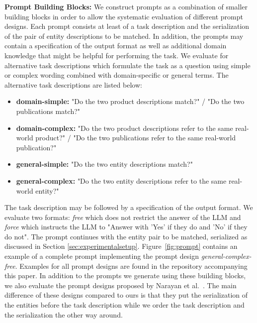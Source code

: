 \documentclass[sigconf,nonacm]{acmart}
\begin{document}
\textbf{Prompt Building Blocks:} We construct prompts as a combination of smaller building blocks in order to allow the systematic evaluation of different prompt designs. Each prompt consists at least of a task description and the serialization of the pair of entity descriptions to be matched. In addition, the prompts may contain a specification of the output format as well as additional domain knowledge that might be helpful for performing the task. We evaluate for alternative task descriptions which formulate the task as a question using simple or complex wording combined with domain-specific or general terms. The alternative task descriptions are listed below: 
\begin{itemize}
    \item \textbf{domain-simple:} "Do the two product descriptions match?" / "Do the two publications match?"
    \item \textbf{domain-complex:} "Do the two product descriptions refer to the same real-world product?" / "Do the two publications refer to the same real-world publication?"
    \item \textbf{general-simple:} "Do the two entity descriptions match?"
    \item \textbf{general-complex:} "Do the two entity descriptions refer to the same real-world entity?"
\end{itemize}
The task description may be followed by a specification of the output format. We evaluate two formats: \textit{free} which does not restrict the answer of the LLM and \textit{force} which instructs the LLM to "Answer with 'Yes' if they do and 'No' if they do not". The prompt continues with the entity pair to be matched, serialized as discussed in Section \ref{sec:experimentalsetup}. Figure~\ref{fig:prompt} contains an example of a complete prompt implementing the prompt design \textit{general-complex-free}. Examples for all prompt designs are found in the repository accompanying this paper.
 In addition to the prompts we generate using these building blocks, we also evaluate the prompt designs proposed by Narayan et al.~\cite{foundationalWrangleVLDB2022}. The main difference of these designs compared to ours is that they put the serialization of the entities before the task description while we order the task description and the serialization the other way around.  
 
\end{document}
